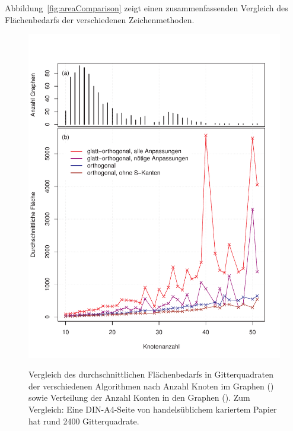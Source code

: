 \documentclass[a4paper]{scrreprt}
\theoremstyle{definition}
\begin{document}
Abbildung~\ref{fig:areaComparison} zeigt einen zusammenfassenden Vergleich des Flächenbedarfs der verschiedenen Zeichenmethoden.








\begin{figure}[p]
  \centering
  {\includegraphics[width=\textwidth]{area_comparison} \label{fig:graphSizes} \label{fig:areaComparison}}
  \caption{Vergleich des durchschnittlichen Flächenbedarfs in Gitterquadraten der verschiedenen Algorithmen nach Anzahl Knoten im Graphen () sowie  Verteilung der Anzahl Konten in den Graphen (). Zum Vergleich: Eine DIN-A4-Seite von handelsüblichem kariertem Papier hat rund 2400 Gitterquadrate.}
  \label{fig:areaComparisonAndGraphSizes}
\end{figure}
\end{document}
